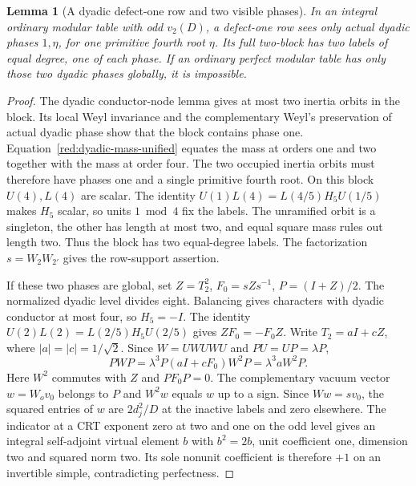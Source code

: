 \documentclass[11pt,a4paper]{article}
\numberwithin{equation}{section}
\newtheorem{lemma}[theorem]{Lemma}
\begin{document}
\begin{lemma}[A dyadic defect-one row and two visible phases]
\label{red:ef:ordinary-dyadic-phases}
In an integral ordinary modular table with odd $v_2(D)$, a
defect-one row sees only actual dyadic phases $1,\eta$, for one
primitive fourth root $\eta$. Its full two-block has two labels
of equal degree, one of each phase. If an ordinary perfect
modular table has only those two dyadic phases globally, it is
impossible.
\end{lemma}
\begin{proof}
The dyadic conductor-node lemma gives at most two inertia orbits
in the block. Its local Weyl invariance and the complementary
Weyl's preservation of actual dyadic phase show that the block
contains phase one. Equation~\eqref{red:dyadic-mass-unified} equates the mass at orders
one and two together with the mass at order four.
The two occupied inertia orbits must therefore have phases one
and a single primitive fourth root. On this block $U(4),L(4)$
are scalar. The identity
$U(1)L(4)=L(4/5)H_5U(1/5)$ makes $H_5$ scalar, so units
$1\bmod4$ fix the labels. The unramified orbit is a singleton,
the other has length at most two, and equal square mass rules
out length two. Thus the block has two equal-degree labels.
The factorization $s=W_2W_{2'}$ gives the row-support assertion.

If these two phases are global, set $Z=T_2^2$, $F_0=sZs^{-1}$,
$P=(I+Z)/2$. The normalized dyadic level divides eight. Balancing gives
characters with dyadic conductor at most four, so $H_5=-I$.
The identity $U(2)L(2)=L(2/5)H_5U(2/5)$ gives $ZF_0=-F_0Z$.
Write $T_2=aI+cZ$, where $|a|=|c|=1/\sqrt2$.
Since $W=UWUWU$ and $PU=UP=\lambda P$,
\[
 PWP=\lambda^3 P(aI+cF_0)W^2P=\lambda^3 a W^2P .
\]
Here $W^2$ commutes with $Z$ and $PF_0P=0$. The complementary
vacuum vector $w=W_o v_0$ belongs to $P$ and $W^2w$ equals $w$
up to a sign. Since $Ww=sv_0$, the squared entries of $w$ are
$2d_j^2/D$ at the inactive labels and zero elsewhere.
The indicator at a CRT exponent zero at two and one on the odd
level gives an integral self-adjoint virtual element $b$ with
$b^2=2b$, unit coefficient one, dimension two and squared norm
two. Its sole nonunit coefficient is therefore $+1$ on an
invertible simple, contradicting perfectness.
\end{proof}
\end{document}
